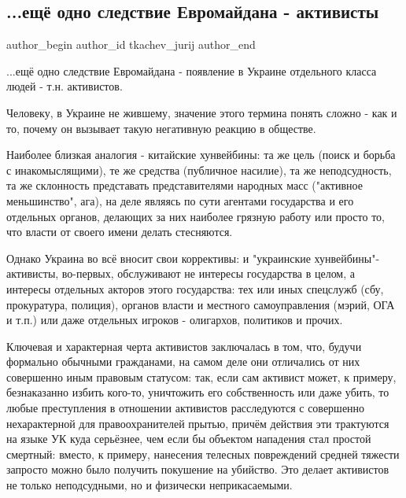  
 
 
 
 
\subsection{...ещё одно следствие Евромайдана - активисты}


\ifcmt
 author_begin
   author_id tkachev_jurij
 author_end
\fi

...ещё одно следствие Евромайдана - появление в Украине отдельного класса людей
- т.н. активистов. 

Человеку, в Украине не жившему, значение этого термина понять сложно - как и
то, почему он вызывает такую негативную реакцию в обществе.

Наиболее близкая аналогия - китайские хунвейбины: та же цель (поиск и борьба с
инакомыслящими), те же средства (публичное насилие), та же неподсудность, та же
склонность представать представителями народных масс ("активное меньшинство",
ага), на деле являясь по сути агентами государства и его отдельных органов,
делающих за них наиболее грязную работу или просто то, что власти от своего
имени делать стесняются. 

Однако Украина во всё вносит свои коррективы: и "украинские
хунвейбины"-активисты, во-первых, обслуживают не интересы государства в целом,
а интересы отдельных акторов этого государства: тех или иных спецслужб (сбу,
прокуратура, полиция), органов власти и местного самоуправления (мэрий, ОГА и
т.п.) или даже отдельных игроков - олигархов, политиков и прочих.

Ключевая и характерная черта активистов заключалась в том, что, будучи
формально обычными гражданами, на самом деле они отличались от них совершенно
иным правовым статусом: так, если сам активист может, к примеру, безнаказанно
избить кого-то, уничтожить его собственность или даже убить, то любые
преступления в отношении активистов расследуются с совершенно нехарактерной для
правоохранителей прытью, причём действия эти трактуются на языке УК куда
серьёзнее, чем если бы объектом нападения стал простой смертный: вместо, к
примеру, нанесения телесных повреждений средней тяжести запросто можно было
получить покушение на убийство. Это делает активистов не только неподсудными,
но и физически неприкасаемыми.

